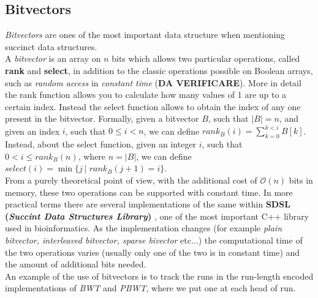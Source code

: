 \documentclass[a4paper,11pt, oneside]{article}
\begin{document}
\subsection*{Bitvectors}
\textit{Bitvectors} are ones of the most important data structure when
mentioning succinct data structures. \\
A \textit{bitvector} is an array on $n$ bits which allows two particular
operations, called \textbf{rank} and \textbf{select}, in addition to the classic
operations possible on Boolean arrays, such as \textit{random access} in
\textit{constant time} (\textbf{DA VERIFICARE}). More in detail the rank
function allows you to calculate how many values of 1 are up to a certain
index. Instead the select function allows to obtain the index of any one present
in the bitvector. Formally, given a bitvector $B$, such that $|B|=n$, and given
an index $i$, such that $0\leq i<n$, we can define $rank_B(i)=\sum_{k=0}^{k<i}
B[k]$. Instead, about the select function, given an integer $i$, such that
$0<i\leq rank_B(n)$, where $n=|B|$,  we can define $select(i)=\min\{j \,| \,\,
rank_B(j+1)=i\}$.\\
From a purely theoretical point of view, with the additional cost of
$\mathcal{O}(n)$ bits in memory, these two operations can be supported with
constant time.  In more practical terms there are several implementations of the
same within \textbf{SDSL (\textit{Succint Data Structures Library})}
, one of the most important C++ library used in bioinformatics. As
the implementation changes (for example \textit{plain bitvector, interleaved
  bitvector, sparse bivector} etc$\ldots$) the computational time of the two
operations varies (usually only one of the two is in constant time) and the
amount of additional bits needed.\\
An example of the use of bitvectors is to track the runs in the run-length
encoded implementations of \textit{BWT} and \textit{PBWT}, where we put one at
each head of run.
\end{document}
